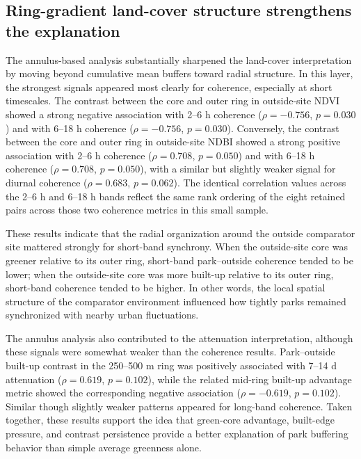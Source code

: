 \subsection{Ring-gradient land-cover structure strengthens the explanation}

The annulus-based analysis substantially sharpened the land-cover interpretation by moving beyond cumulative mean buffers toward radial structure. In this layer, the strongest signals appeared most clearly for coherence, especially at short timescales. The contrast between the core and outer ring in outside-site NDVI showed a strong negative association with 2--6 h coherence ($\rho = -0.756$, $p = 0.030$) and with 6--18 h coherence ($\rho = -0.756$, $p = 0.030$). Conversely, the contrast between the core and outer ring in outside-site NDBI showed a strong positive association with 2--6 h coherence ($\rho = 0.708$, $p = 0.050$) and with 6--18 h coherence ($\rho = 0.708$, $p = 0.050$), with a similar but slightly weaker signal for diurnal coherence ($\rho = 0.683$, $p = 0.062$). The identical correlation values across the 2--6 h and 6--18 h bands reflect the same rank ordering of the eight retained pairs across those two coherence metrics in this small sample.

These results indicate that the radial organization around the outside comparator site mattered strongly for short-band synchrony. When the outside-site core was greener relative to its outer ring, short-band park--outside coherence tended to be lower; when the outside-site core was more built-up relative to its outer ring, short-band coherence tended to be higher. In other words, the local spatial structure of the comparator environment influenced how tightly parks remained synchronized with nearby urban fluctuations. %

The annulus analysis also contributed to the attenuation interpretation, although these signals were somewhat weaker than the coherence results. Park--outside built-up contrast in the 250--500 m ring was positively associated with 7--14 d attenuation ($\rho = 0.619$, $p = 0.102$), while the related mid-ring built-up advantage metric showed the corresponding negative association ($\rho = -0.619$, $p = 0.102$). Similar though slightly weaker patterns appeared for long-band coherence. Taken together, these results support the idea that green-core advantage, built-edge pressure, and contrast persistence provide a better explanation of park buffering behavior than simple average greenness alone.


